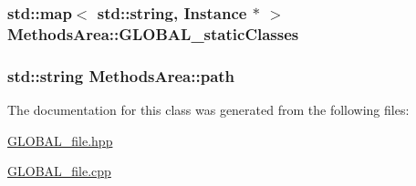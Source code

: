 \subsubsection[{\texorpdfstring{G\+L\+O\+B\+A\+L\+\_\+static\+Classes}{GLOBAL_staticClasses}}]{\setlength{\rightskip}{0pt plus 5cm}std\+::map$<$ std\+::string, {\bf Instance} $\ast$ $>$ Methods\+Area\+::\+G\+L\+O\+B\+A\+L\+\_\+static\+Classes\hspace{0.3cm}{\ttfamily [static]}}\hypertarget{class_methods_area_a34d779cc67f370a08cedc65245af2e7e}{}\label{class_methods_area_a34d779cc67f370a08cedc65245af2e7e}
\subsubsection[{\texorpdfstring{path}{path}}]{\setlength{\rightskip}{0pt plus 5cm}std\+::string Methods\+Area\+::path\hspace{0.3cm}{\ttfamily [static]}}\hypertarget{class_methods_area_af7210f4ca8ad442f7f9b83baa750b015}{}\label{class_methods_area_af7210f4ca8ad442f7f9b83baa750b015}


The documentation for this class was generated from the following files\+:\begin{DoxyCompactItemize}
\item 
\hyperlink{_g_l_o_b_a_l__file_8hpp}{G\+L\+O\+B\+A\+L\+\_\+file.\+hpp}\item 
\hyperlink{_g_l_o_b_a_l__file_8cpp}{G\+L\+O\+B\+A\+L\+\_\+file.\+cpp}\end{DoxyCompactItemize}
